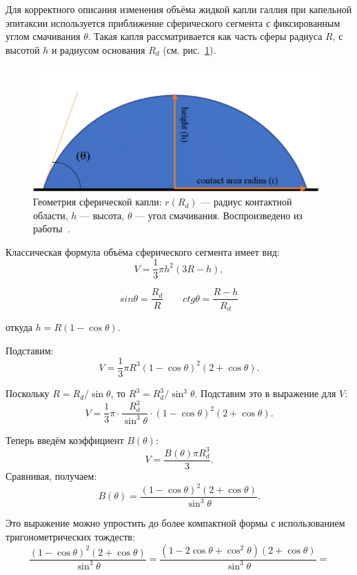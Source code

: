 \documentclass[14pt,oneside]{extarticle}
\begin{document}
Для корректного описания изменения объёма жидкой капли галлия при капельной эпитаксии используется приближение сферического сегмента с фиксированным углом смачивания $\theta$. Такая капля рассматривается как часть сферы радиуса $R$, с высотой $h$ и радиусом основания $R_d$ (см. рис.~\ref{fig:drop_geom}).

\begin{figure}[H]
    \begin{center}
    \includegraphics[width=11cm]{images/contact_angle_schematic.png}
    \caption{\label{fig:drop_geom}
    Геометрия сферической капли: $r(R_d)$ — радиус контактной области, $h$ — высота, $\theta$ — угол смачивания. Воспроизведено из работы~\cite{aboubakri2021}.}
    \end{center}
\end{figure}

Классическая формула объёма сферического сегмента имеет вид:
\begin{equation}
V = \frac{1}{3} \pi h^2 (3R - h),
\end{equation}

\[
sin\theta = \frac{R_d}{R}
\qquad
ctg\theta = \frac{R-h}{R_d}
\]

откуда $h = R(1 - \cos\theta)$.

Подставим:
\[
V = \frac{1}{3} \pi R^3 (1 - \cos\theta)^2 (2 + \cos\theta).
\]

Поскольку $R = R_d / \sin\theta$, то $R^3 = R_d^3 / \sin^3\theta$. Подставим это в выражение для $V$:
\[
V = \frac{1}{3} \pi \cdot \frac{R_d^3}{\sin^3 \theta} \cdot (1 - \cos\theta)^2 (2 + \cos\theta).
\]

Теперь введём коэффициент $B(\theta)$:
\begin{equation}
V = \frac{B(\theta)\pi R_d^3}{3}.
\end{equation}
Сравнивая, получаем:
\[
B(\theta) = \frac{\left(1-\cos\theta\right)^{2}\left(2+\cos\theta\right)}{\sin^{3}\theta}.
\]

Это выражение можно упростить до более компактной формы с использованием тригонометрических тождеств:
\[
\frac{\left(1-\cos\theta\right)^{2}\left(2+\cos\theta\right)}{\sin^{3}\theta}=\frac{\left(1-2\cos\theta+\cos^{2}\theta\right)\left(2+\cos\theta\right)}{\sin^{3}\theta}=
\]
\end{document}
